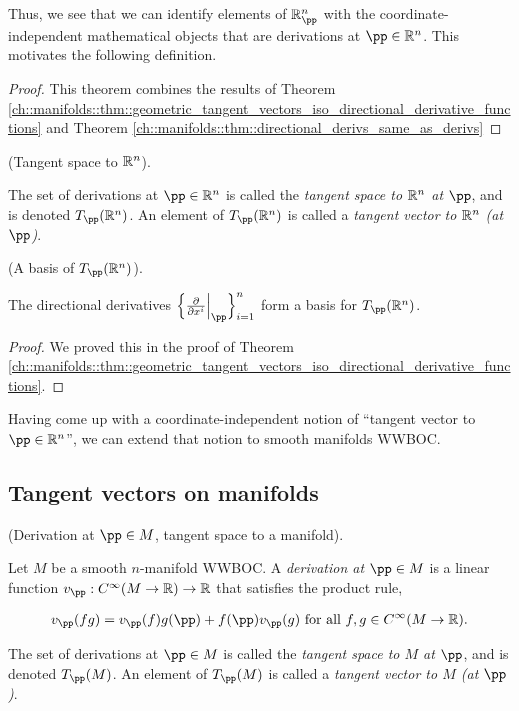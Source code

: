 Thus, we see that we can identify elements of $\R^n_\pp$ with the coordinate-independent mathematical objects that are derivations at $\pp \in \R^n$. This motivates the following definition.

\begin{proof}
    This theorem combines the results of Theorem \ref{ch::manifolds::thm::geometric_tangent_vectors_iso_directional_derivative_functions} and Theorem \ref{ch::manifolds::thm::directional_derivs_same_as_derivs}
\end{proof}

\begin{defn}
    (Tangent space to $\mathbb{R}^n$).
    
    The set of derivations at $\pp \in \R^n$ is called the \textit{tangent space to $\mathbb{R}^n$ at $\pp$}, and is denoted $T_\pp(\R^n)$. An element of $T_\pp(\R^n)$ is called a \textit{tangent vector to $\mathbb{R}^n$ (at $\pp$)}.
\end{defn}

\begin{theorem}
\label{ch::manifolds::thm::basis_of_TpRn}
     (A basis of $T_\pp(\R^n)$).
    
    The directional derivatives $\Big\{ \frac{\pd}{\pd x^i}\Big|_\pp \Big\}_{i = 1}^n$ form a basis for $T_\pp(\R^n)$.
\end{theorem}
    
\begin{proof}
     We proved this in the proof of Theorem \ref{ch::manifolds::thm::geometric_tangent_vectors_iso_directional_derivative_functions}.
\end{proof}

Having come up with a coordinate-independent notion of ``tangent vector to $\pp \in \R^n$'', we can extend that notion to smooth manifolds WWBOC.

\subsection*{Tangent vectors on manifolds}

\begin{defn}
     (Derivation at $\pp \in M$, tangent space to a manifold). 
    
    Let $M$ be a smooth $n$-manifold WWBOC. A \textit{derivation at $\pp \in M$} is a linear function $v_\pp:C^\infty(M \rightarrow \R) \rightarrow \R$ that satisfies the product rule,
    
    \begin{align*}
        v_\pp(fg) = v_\pp(f)g(\pp) + f(\pp)v_\pp(g) \text{ for all $f, g \in C^\infty(M \rightarrow \R)$}.
    \end{align*}
    
    The set of derivations at $\pp \in M$ is called the \textit{tangent space to $M$ at $\pp$}, and is denoted $T_\pp(M)$. An element of $T_\pp(M)$ is called a \textit{tangent vector to $M$ (at $\pp$)}.
\end{defn}

